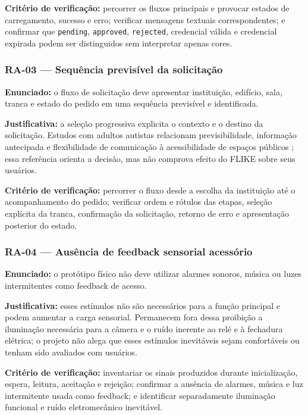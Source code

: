 \textbf{Critério de verificação:} percorrer os fluxos principais e provocar estados de carregamento, sucesso e erro; verificar mensagens textuais correspondentes; e confirmar que \texttt{pending}, \texttt{approved}, \texttt{rejected}, credencial válida e credencial expirada podem ser distinguidos sem interpretar apenas cores.

\subsubsection*{RA-03 --- Sequência previsível da solicitação}

\textbf{Enunciado:} o fluxo de solicitação deve apresentar instituição, edifício, sala, tranca e estado do pedido em uma sequência previsível e identificada.

\textbf{Justificativa:} a seleção progressiva explicita o contexto e o destino da solicitação. Estudos com adultos autistas relacionam previsibilidade, informação antecipada e flexibilidade de comunicação à acessibilidade de espaços públicos \cite{maclennan2023sensory}; essa referência orienta a decisão, mas não comprova efeito do FLIKE sobre seus usuários.

\textbf{Critério de verificação:} percorrer o fluxo desde a escolha da instituição até o acompanhamento do pedido; verificar ordem e rótulos das etapas, seleção explícita da tranca, confirmação da solicitação, retorno de erro e apresentação posterior do estado.

\subsubsection*{RA-04 --- Ausência de feedback sensorial acessório}

\textbf{Enunciado:} o protótipo físico não deve utilizar alarmes sonoros, música ou luzes intermitentes como feedback de acesso.

\textbf{Justificativa:} esses estímulos não são necessários para a função principal e podem aumentar a carga sensorial. Permanecem fora dessa proibição a iluminação necessária para a câmera e o ruído inerente ao relé e à fechadura elétrica; o projeto não alega que esses estímulos inevitáveis sejam confortáveis ou tenham sido avaliados com usuários.

\textbf{Critério de verificação:} inventariar os sinais produzidos durante inicialização, espera, leitura, aceitação e rejeição; confirmar a ausência de alarmes, música e luz intermitente usada como feedback; e identificar separadamente iluminação funcional e ruído eletromecânico inevitável.

